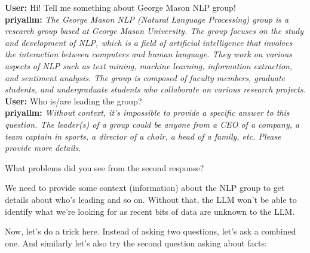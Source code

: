 \documentclass[11pt,addpoints,answers]{exam}
\begin{document}
\begin{questions}
    \begin{tcolorbox}[fit,height=3cm, width=16cm, blank, borderline={1pt}{-2pt},nobeforeafter]
    \textbf{User:} Hi! Tell me something about George Mason NLP group!
    \\
    \textbf{priyallm:} \textit{The George Mason NLP (Natural Language Processing) group is a research group based at George Mason University. The group focuses on the study and development of NLP, which is a field of artificial intelligence that involves the interaction between computers and human language. They work on various aspects of NLP such as text mining, machine learning, information extraction, and sentiment analysis. The group is composed of faculty members, graduate students, and undergraduate students who collaborate on various research projects. }
    \\
    \textbf{User:} Who is/are leading the group?
    \\
    \textbf{priyallm:} \textit{ Without context, it's impossible to provide a specific answer to this question. The leader(s) of a group could be anyone from a CEO of a company, a team captain in sports, a director of a choir, a head of a family, etc. Please provide more details.}
    \end{tcolorbox} 

    What problems did you see from the second response? 
    
    \begin{tcolorbox}[fit,height=2cm, width=16cm, blank, borderline={1pt}{-2pt},nobeforeafter]
    We need to provide some context (information) about the NLP group to get details about who's leading and so on. Without that, the LLM won't be able to identify what we're looking for as recent bits of data are unknown to the LLM.
    \end{tcolorbox} 

    \question[10] Now, let's do a trick here. Instead of asking two questions, let's ask a combined one. And similarly let's also try the second question asking about facts:


\end{questions}
\end{document}
